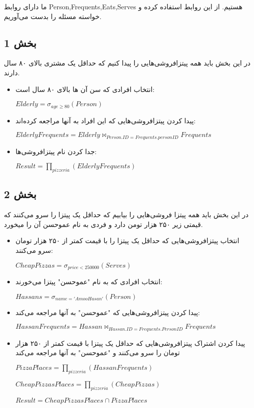 ما دارای روابط Person,Frequents,Eats,Serves هستیم. از این روابط استفاده کرده و خواسته مسئله را بدست می‌آوریم.
\subsection*{بخش 1}
در این بخش باید همه پیتزافروشی‌هایی را پیدا کنیم که حداقل یک مشتری بالای ۸۰ سال دارند.
\begin{itemize}	
	\item انتخاب افرادی که سن آن ها بالای ۸۰ سال است:
	
	\setLTR
	$Elderly = \sigma_{age \geq 80} (Person)$
	\setRTL
	\item پیدا کردن پیتزافروشی‌هایی که این افراد به آنها مراجعه کرده‌اند:
	
	\setLTR
	$ElderlyFrequents = Elderly \bowtie_{Person.ID=Frequents.personID} Frequents$
	\setRTL
	
	\item جدا کردن نام پیتزافروشی‌ها:
	
	\setLTR
	$Result = \prod_{pizzeria} (ElderlyFrequents)$
	\setRTL
\end{itemize}




\subsection*{بخش 2}
در این بخش باید همه پیتزا فروشی‌هایی را بیابیم که حداقل یک پیتزا را سرو می‌کنند که قیمتی زیر ۲۵۰ هزار
تومن دارد و فردی به نام عموحسن آن را میخورد.
\begin{itemize}	
	\item انتخاب پیتزافروشی‌هایی که حداقل یک پیتزا را با قیمت کمتر از ۲۵۰ هزار تومان سرو می‌کنند:
	
	\setLTR
	$CheapPizzas = \sigma_{price < 250000} (Serves)$
	\setRTL
	
	\item انتخاب افرادی که به نام "عموحسن" پیتزا می‌خورند: 
	
	\setLTR
	$Hassans = \sigma_{name = 'AmooHasan'} (Person)$
	\setRTL
	
	\item پیدا کردن پیتزافروشی‌هایی که "عموحسن" به آنها مراجعه می‌کند: 
	
	\setLTR
	$HassanFrequents = Hassan \bowtie_{Hassan.ID=Frequents.PersonID} Frequents$
	\setRTL
	
	\item پیدا کردن اشتراک پیتزافروشی‌هایی که حداقل یک پیتزا با قیمت کمتر از ۲۵۰ هزار تومان را سرو می‌کنند و "عموحسن" به آنها مراجعه می‌کند
	
	\setLTR
	$PizzaPlaces = \prod_{pizzeria} (HassanFrequents)$
	
	$CheapPizzasPlaces = \prod_{pizzeria} (CheapPizzas)$
	
	$Result = CheapPizzasPlaces \cap PizzaPlaces$
	\setRTL

\end{itemize}
\pagebreak

